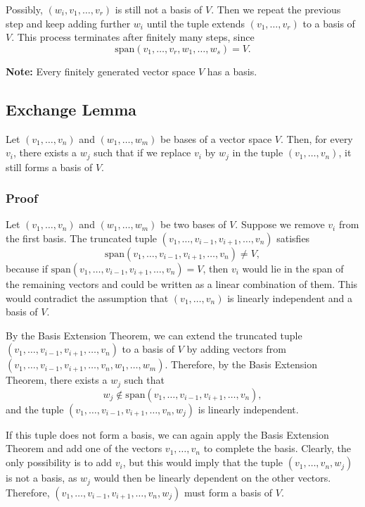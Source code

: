 Possibly, \((w_i, v_1, \ldots, v_r)\) is still not a basis of \(V\). Then we repeat the previous step and keep adding further \(w_i\) until the tuple extends \((v_1, \ldots, v_r)\) to a basis of \(V\). This process terminates after finitely many steps, since
\[
\text{span}(v_1, \ldots, v_r, w_1, \ldots, w_s) = V.
\]
\QED

\textbf{Note:} Every finitely generated vector space \(V\) has a basis.

\subsection{Exchange Lemma}

Let \((v_1, \ldots, v_n)\) and \((w_1, \ldots, w_m)\) be bases of a vector space \(V\). Then, for every \(v_i\), there exists a \(w_j\) such that if we replace \(v_i\) by \(w_j\) in the tuple \((v_1, \ldots, v_n)\), it still forms a basis of \(V\).

\subsubsection*{Proof}

Let \((v_1, \ldots, v_n)\) and \((w_1, \ldots, w_m)\) be two bases of \(V\). Suppose we remove \(v_i\) from the first basis. The truncated tuple \((v_1, \ldots, v_{i-1}, v_{i+1}, \ldots, v_n)\) satisfies
\[
\text{span}(v_1, \ldots, v_{i-1}, v_{i+1}, \ldots, v_n) \neq V,
\]
because if \(\text{span}(v_1, \ldots, v_{i-1}, v_{i+1}, \ldots, v_n) = V\), then \(v_i\) would lie in the span of the remaining vectors and could be written as a linear combination of them. This would contradict the assumption that \((v_1, \ldots, v_n)\) is linearly independent and a basis of \(V\).

By the Basis Extension Theorem, we can extend the truncated tuple \((v_1, \ldots, v_{i-1}, v_{i+1}, \ldots, v_n)\) to a basis of \(V\) by adding vectors from \((v_1, \ldots, v_{i-1}, v_{i+1}, \ldots, v_n, w_1, \ldots, w_m)\). Therefore, by the Basis Extension Theorem, there exists a \(w_j\) such that
\[
w_j \notin \text{span}(v_1, \ldots, v_{i-1}, v_{i+1}, \ldots, v_n),
\]
and the tuple \((v_1, \ldots, v_{i-1}, v_{i+1}, \ldots, v_n, w_j)\) is linearly independent.

If this tuple does not form a basis, we can again apply the Basis Extension Theorem and add one of the vectors \(v_1, \ldots, v_n\) to complete the basis. Clearly, the only possibility is to add \(v_i\), but this would imply that the tuple \((v_1, \ldots, v_n, w_j)\) is not a basis, as \(w_j\) would then be linearly dependent on the other vectors. Therefore, \((v_1, \ldots, v_{i-1}, v_{i+1}, \ldots, v_n, w_j)\) must form a basis of \(V\).

